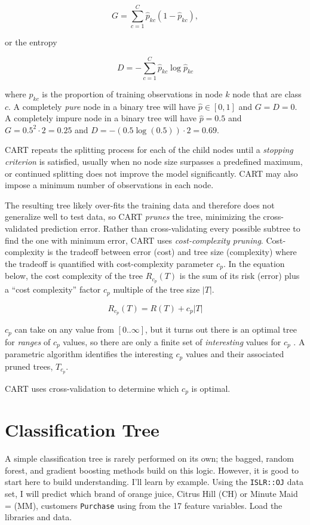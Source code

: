 \documentclass[
]{book}
\begin{document}
\[G = \sum_{c=1}^C{\hat{p}_{kc}(1 - \hat{p}_{kc})},\]

or the entropy

\[D = - \sum_{c=1}^C{\hat{p}_{kc} \log \hat{p}_{kc}}\]

where \(\hat{p}_{kc}\) is the proportion of training observations in node \(k\) node that are class \(c\). A completely \emph{pure} node in a binary tree will have \(\hat{p} \in [0, 1]\) and \(G = D = 0\). A completely impure node in a binary tree will have \(\hat{p} = 0.5\) and \(G = 0.5^2 \cdot 2 = 0.25\) and \(D = -(0.5 \log(0.5)) \cdot 2 = 0.69\).

CART repeats the splitting process for each of the child nodes until a \emph{stopping criterion} is satisfied, usually when no node size surpasses a predefined maximum, or continued splitting does not improve the model significantly. CART may also impose a minimum number of observations in each node.

The resulting tree likely over-fits the training data and therefore does not generalize well to test data, so CART \emph{prunes} the tree, minimizing the cross-validated prediction error. Rather than cross-validating every possible subtree to find the one with minimum error, CART uses \emph{cost-complexity pruning}. Cost-complexity is the tradeoff between error (cost) and tree size (complexity) where the tradeoff is quantified with cost-complexity parameter \(c_p\). In the equation below, the cost complexity of the tree \(R_{c_p}(T)\) is the sum of its risk (error) plus a ``cost complexity'' factor \(c_p\) multiple of the tree size \(|T|\).

\[R_{c_p}(T) = R(T) + c_p|T|\]

\(c_p\) can take on any value from \([0..\infty]\), but it turns out there is an optimal tree for \emph{ranges} of \(c_p\) values, so there are only a finite set of \emph{interesting} values for \(c_p\) \citep{James2013} \citep{Therneau2019} \citep{Kuhn2016}. A parametric algorithm identifies the interesting \(c_p\) values and their associated pruned trees, \(T_{c_p}\).

CART uses cross-validation to determine which \(c_p\) is optimal.

\hypertarget{classification-tree}{%
\section{Classification Tree}\label{classification-tree}}

A simple classification tree is rarely performed on its own; the bagged, random forest, and gradient boosting methods build on this logic. However, it is good to start here to build understanding. I'll learn by example. Using the \texttt{ISLR::OJ} data set, I will predict which brand of orange juice, Citrus Hill (CH) or Minute Maid = (MM), customers \texttt{Purchase} using from the 17 feature variables. Load the libraries and data.
\end{document}
